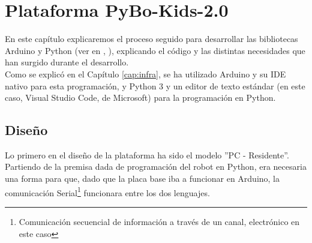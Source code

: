 \chapter{Plataforma PyBo-Kids-2.0}
\label{cap:PyBoKids}
En este capítulo explicaremos el proceso seguido para desarrollar las bibliotecas Arduino y Python (ver en \cite{arduinolenguaje}, \cite{PythonRef}), explicando el código y las distintas necesidades que han surgido durante el desarrollo. \\
Como se explicó en el Capítulo \ref{cap:infra}, se ha utilizado Arduino  y su IDE nativo para esta programación, y Python 3 y un editor de texto estándar (en este caso, Visual Studio Code, de Microsoft) para la programación en Python. 

\section{Diseño}\label{sec:diseño}
Lo primero en el diseño de la plataforma ha sido el modelo ''PC - Residente''. Partiendo de la premisa dada de programación del robot en Python, era necesaria una forma para que, dado que la placa base iba a funcionar en Arduino, la comunicación Serial\footnote{Comunicación secuencial de información a través de un canal, electrónico en este caso} funcionara entre los dos lenguajes. \\
